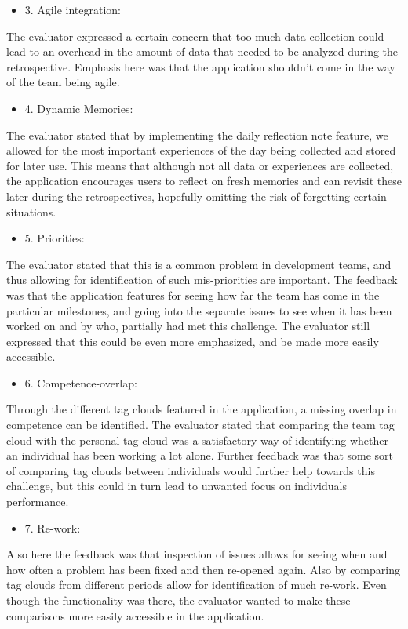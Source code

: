 \begin{itemize}
    \item 3. Agile integration: 
\end{itemize}
The evaluator expressed a certain concern that too much data collection could lead to an overhead in the amount of data that needed to be analyzed during the retrospective. Emphasis here was that the application shouldn't come in the way of the team being agile. 

\begin{itemize}
    \item 4. Dynamic Memories:
\end{itemize}
 The evaluator stated that by implementing the daily reflection note feature, we allowed for the most important experiences of the day being collected and stored for later use. This means that although not all data or experiences are collected, the application encourages users to reflect on fresh memories and can revisit these later during the retrospectives, hopefully omitting the risk of forgetting certain situations. 

\begin{itemize}
    \item 5. Priorities: 
\end{itemize}
The evaluator stated that this is a common problem in development teams, and thus allowing for identification of such mis-priorities are important. The feedback was that the application features for seeing how far the team has come in the particular milestones, and going into the separate issues to see when it has been worked on and by who, partially had met this challenge. The evaluator still expressed that this could be even more emphasized, and be made more easily accessible. 

\begin{itemize}
    \item 6. Competence-overlap:  
\end{itemize}
Through the different tag clouds featured in the application, a missing overlap in competence can be identified. The evaluator stated that comparing the team tag cloud with the personal tag cloud was a satisfactory way of identifying whether an individual has been working a lot alone. Further feedback was that some sort of comparing tag clouds between individuals would further help towards this challenge, but this could in turn lead to unwanted focus on individuals performance.

\begin{itemize}
    \item 7. Re-work: 
\end{itemize}
 Also here the feedback was that inspection of issues allows for seeing when and how often a problem has been fixed and then re-opened again. Also by comparing tag clouds from different periods allow for identification of much re-work. Even though the functionality was there, the evaluator wanted to make these comparisons more easily accessible in the application.

